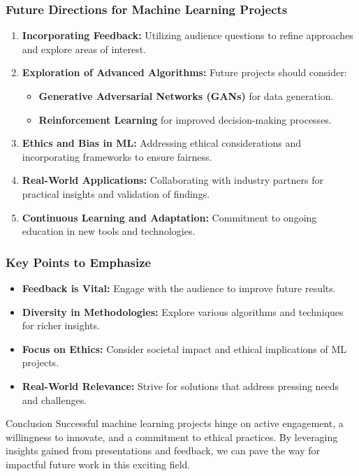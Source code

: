 \documentclass[aspectratio=169]{beamer}
\begin{document}
\begin{frame}[fragile]
  \frametitle{Future Directions for Machine Learning Projects}

  \begin{enumerate}
    \item \textbf{Incorporating Feedback:} Utilizing audience questions to refine approaches and explore areas of interest.
    
    \item \textbf{Exploration of Advanced Algorithms:} Future projects should consider:
    \begin{itemize}
      \item \textbf{Generative Adversarial Networks (GANs)} for data generation.
      \item \textbf{Reinforcement Learning} for improved decision-making processes.
    \end{itemize}

    \item \textbf{Ethics and Bias in ML:} Addressing ethical considerations and incorporating frameworks to ensure fairness.
    
    \item \textbf{Real-World Applications:} Collaborating with industry partners for practical insights and validation of findings.
    
    \item \textbf{Continuous Learning and Adaptation:} Commitment to ongoing education in new tools and technologies.
  \end{enumerate}
\end{frame}

\begin{frame}[fragile]
  \frametitle{Key Points to Emphasize}

  \begin{itemize}
    \item \textbf{Feedback is Vital:} Engage with the audience to improve future results.
    \item \textbf{Diversity in Methodologies:} Explore various algorithms and techniques for richer insights.
    \item \textbf{Focus on Ethics:} Consider societal impact and ethical implications of ML projects.
    \item \textbf{Real-World Relevance:} Strive for solutions that address pressing needs and challenges.
  \end{itemize}

  \begin{block}{Conclusion}
    Successful machine learning projects hinge on active engagement, a willingness to innovate, and a commitment to ethical practices. By leveraging insights gained from presentations and feedback, we can pave the way for impactful future work in this exciting field.
  \end{block}
\end{frame}
\end{document}
